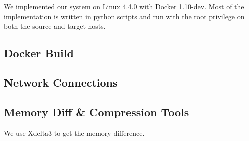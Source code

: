 

We implemented our system on Linux 4.4.0 with Docker 1.10-dev. Most of the implementation is written in python scripts and run with the root privilege on both the source and target hosts.

\subsection{Docker Build}

\subsection{Network Connections}

\subsection{Memory Diff \& Compression Tools
}

We use Xdelta3 to get the memory difference.